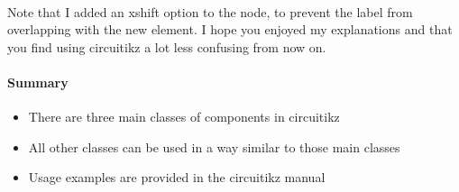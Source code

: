   \paragraph{}
  Note that I added an xshift option to the node, to prevent the label from overlapping with the new element. I hope you enjoyed my explanations and that you find using circuitikz a lot less confusing from now on.

  \paragraph{Summary}
    \begin{itemize} %
      \item There are three main classes of components in circuitikz
      \item All other classes can be used in a way similar to those main classes
      \item Usage examples are provided in the circuitikz manual
    \end{itemize} 
